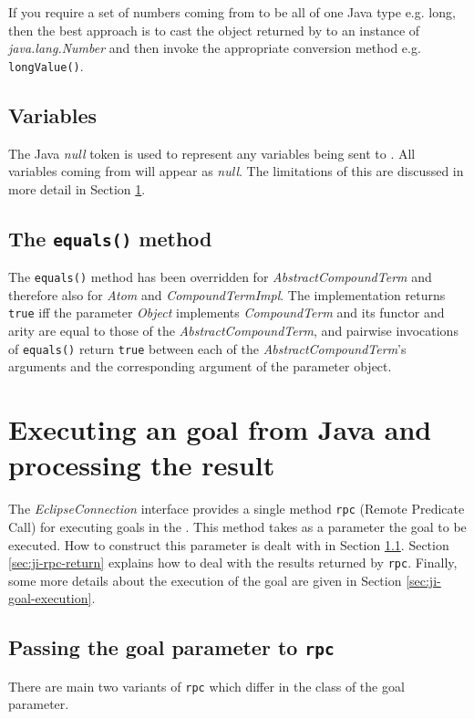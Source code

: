 If you require a set of numbers coming from {\eclipse} to be all of
one Java type e.g. long, then the best approach is to cast the object
returned by {\eclipse} to an instance of {\it java.lang.Number} and
then invoke the appropriate conversion method e.g. {\tt longValue()}.

\subsection{Variables}
\label{sec:ji-variables-null}
The Java {\it null} token is used to represent any variables being
sent to {\eclipse}. All variables coming from {\eclipse} will appear as
{\it null}. The limitations of this are discussed in more detail in
Section \ref{sec:ji-calling-goals}.


\subsection{The {\tt equals()} method}
The {\tt equals()} method has been overridden for {\it
AbstractCompoundTerm} and therefore also for {\it Atom} and {\it
CompoundTermImpl}. The implementation returns {\tt true} iff the
parameter {\it Object} implements {\it CompoundTerm} and its functor
and arity are equal to those of the {\it AbstractCompoundTerm}, and
pairwise invocations of {\tt equals()} return {\tt true} between each
of the {\it AbstractCompoundTerm}'s arguments and the corresponding
argument of the parameter object.



\section{Executing an {\eclipse} goal from Java and processing the result}
\label{sec:ji-calling-goals}
The {\it EclipseConnection}  interface
provides a single method {\tt rpc} (Remote Predicate Call) for executing
goals in the {\eclipse}. This method takes as a parameter the goal to be
executed. How to construct this parameter is dealt with in Section
\ref{sec:ji-rpc-parameter}. Section \ref{sec:ji-rpc-return} explains
how to deal with the results returned by {\tt rpc}. Finally, some more
details about the execution of the goal are given in Section
\ref{sec:ji-goal-execution}. 

\subsection{Passing the goal parameter to {\tt rpc}}
\label{sec:ji-rpc-parameter}
There are main two variants of {\tt rpc} which differ in the class of the
goal parameter.

